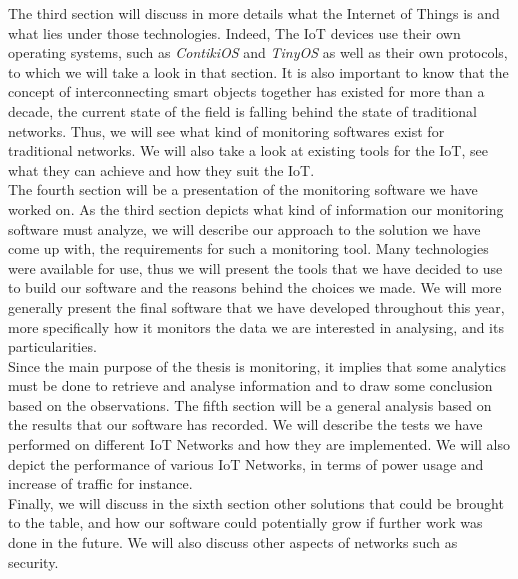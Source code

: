 The third section will discuss in more details what the Internet of Things is and what lies under those technologies. Indeed, The IoT devices use their own operating systems, such as \textit{ContikiOS} and \textit{TinyOS} as well as their own protocols, to which we will take a look in that section. It is also important to know that the concept of interconnecting smart objects together has existed for more than a decade, the current state of the field is falling behind the state of traditional networks. Thus, we will see what kind of monitoring softwares exist for traditional networks. We will also take a look at existing tools for the IoT, see what they can achieve and how they suit the IoT.\\

The fourth section will be a presentation of the monitoring software we have worked on. As the third section depicts what kind of information our monitoring software must analyze, we will describe our approach to the solution we have come up with, the requirements for such a monitoring tool. Many technologies were available for use, thus we will present the tools that we have decided to use to build our software and the reasons behind the choices we made. We will more generally present the final software that we have developed throughout this year, more specifically how it monitors the data we are interested in analysing, and its particularities. \\

Since the main purpose of the thesis is monitoring, it implies that some analytics must be done to retrieve and analyse information and to draw some conclusion based on the observations. The fifth section will be a general analysis based on the results that our software has recorded. We will describe the tests we have performed on different IoT Networks and how they are implemented. We will also depict the performance of various IoT Networks, in terms of power usage and increase of traffic for instance.\\

Finally, we will discuss in the sixth section other solutions that could be brought to the table, and how our software could potentially grow if further work was done in the future. We will also discuss other aspects of networks such as security. 


